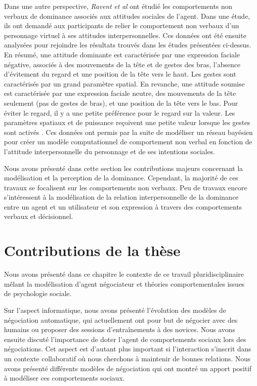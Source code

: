 		Dans une autre perspective,  \emph{Ravent et al} \cite{ravenet2013user} ont étudié les comportements non verbaux de dominance associés aux attitudes sociales de l'agent. Dans une étude, ils ont demandé aux participants de relier le comportement non verbaux d'un personnage virtuel à ses attitudes interpersonnelles. Ces données ont été ensuite analysées pour rejoindre les résultats trouvés dans les études présentées ci-dessus.  
		En résumé, une attitude dominante est caractérisée par une expression faciale négative, associés à des mouvements de la tête et de gestes des bras, l'absence d'évitement du regard et une position de la tête vers le haut. Les gestes sont caractérisés par un grand paramètre spatial. En revanche, une attitude soumise est caractérisée par une expression faciale neutre, des mouvements de la tête seulement (pas de gestes de bras), et une position de la tête vers le bas. Pour éviter le regard, il y a une petite préférence pour le regard sur la valeur. Les paramètres spatiaux et de puissance reçoivent une petite valeur lorsque les gestes sont activés \cite{ravenet2013user}. Ces données ont permis par la suite de
		modéliser un réseau bayésien pour créer un modèle computationnel de comportement non verbal en fonction de l'attitude interpersonnelle du personnage et de ses intentions sociales.
		
		Nous avons présenté dans cette section les contributions majeurs concernant la modélisation et la perception de la dominance. Cependant, la majorité de ces travaux se focalisent sur les comportements non verbaux. Peu de travaux encore s'intéressent à la modélisation de la relation interpersonnelle de la dominance entre un agent et un utilisateur et son expression à travers des comportements verbaux et décisionnel. 
	
	
		\section{Contributions de la thèse}
			Nous avons présenté dans ce chapitre le contexte de ce travail pluridisciplinaire mêlant la modélisation d'agent négociateur et théories comportementales issues de psychologie sociale. 
			
			Sur l'aspect informatique, nous avons présenté l'évolution des modèles de négociation automatique, qui actuellement ont pour but de négocier avec des humains ou proposer des sessions d'entraînements à des novices. 			 
			Nous avons ensuite discuté l'importance de doter l'agent de comportements sociaux lors des négociations. Cet aspect est d'autant plus important si l'interaction s'inscrit dans un contexte collaboratif où nous cherchons à maintenir de bonnes relations. Nous avons présenté différents modèles de négociation qui ont montré un apport positif à modéliser ces comportements sociaux. 
			
